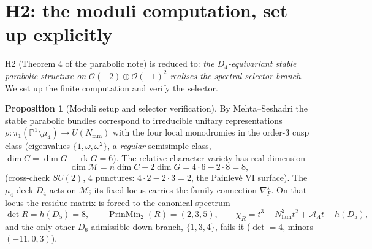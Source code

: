 \documentclass[11pt,a4paper]{article}
\newcommand{\Nfam}{N_{\mathrm{fam}}}
\newcommand{\AL}{\mathcal A_\Lambda}
\newcommand{\PP}{\mathbb{P}}
\theoremstyle{definition}
\newtheorem{proposition}{Proposition}
\begin{document}
\section{H2: the moduli computation, set up explicitly}
H2 (Theorem 4 of the parabolic note) is reduced to: \emph{the $D_4$-equivariant stable parabolic
structure on $\mathcal O(-2)\oplus\mathcal O(-1)^2$ realises the spectral-selector branch}. We set up the
finite computation and verify the selector.

\begin{proposition}[Moduli setup and selector verification]
\label{prop:h2}
By Mehta--Seshadri the stable parabolic bundles correspond to irreducible unitary representations
$\rho:\pi_1(\PP^1\setminus\mu_4)\to U(\Nfam)$ with the four local monodromies in the order-$3$ cusp class
(eigenvalues $\{1,\omega,\omega^2\}$, a \emph{regular} semisimple class, $\dim C=\dim G-\operatorname{rk}G=6$).
The relative character variety has real dimension
\[
  \dim\mathcal M=n\dim C-2\dim G=4\cdot6-2\cdot8=8 ,
\]
(cross-check $SU(2)$, $4$ punctures: $4\cdot2-2\cdot3=2$, the Painlev\'e VI surface). The $\mu_4$ deck
$D_4$ acts on $\mathcal M$; its fixed locus carries the family connection $\nabla_F^\star$. On that locus
the residue matrix is forced to the canonical spectrum
\[
  \det R=h(D_5)=8,\qquad \operatorname{PrinMin}_2(R)=(2,3,5),\qquad \chi_R=t^3-\Nfam^2t^2+\AL t-h(D_5),
\]
and the only other $D_6$-admissible down-branch, $\{1,3,4\}$, fails it ($\det=4$, minors $(-11,0,3)$).
\end{proposition}
\end{document}

